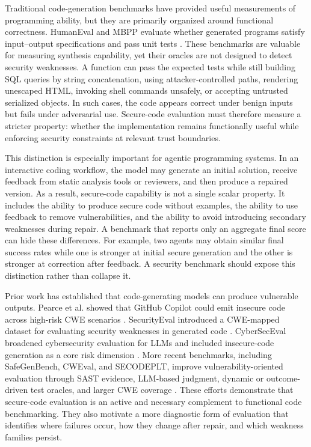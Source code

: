 \documentclass[11pt]{article}
\begin{document}
Traditional code-generation benchmarks have provided useful measurements of programming ability, but they are primarily organized around functional correctness. HumanEval and MBPP evaluate whether generated programs satisfy input--output specifications and pass unit tests \cite{chen2021codex,austin2021programsynthesis}. These benchmarks are valuable for measuring synthesis capability, yet their oracles are not designed to detect security weaknesses. A function can pass the expected tests while still building SQL queries by string concatenation, using attacker-controlled paths, rendering unescaped HTML, invoking shell commands unsafely, or accepting untrusted serialized objects. In such cases, the code appears correct under benign inputs but fails under adversarial use. Secure-code evaluation must therefore measure a stricter property: whether the implementation remains functionally useful while enforcing security constraints at relevant trust boundaries.

This distinction is especially important for agentic programming systems. In an interactive coding workflow, the model may generate an initial solution, receive feedback from static analysis tools or reviewers, and then produce a repaired version. As a result, secure-code capability is not a single scalar property. It includes the ability to produce secure code without examples, the ability to use feedback to remove vulnerabilities, and the ability to avoid introducing secondary weaknesses during repair. A benchmark that reports only an aggregate final score can hide these differences. For example, two agents may obtain similar final success rates while one is stronger at initial secure generation and the other is stronger at correction after feedback. A security benchmark should expose this distinction rather than collapse it.

Prior work has established that code-generating models can produce vulnerable outputs. Pearce et al. showed that GitHub Copilot could emit insecure code across high-risk CWE scenarios \cite{pearce2022asleep}. SecurityEval introduced a CWE-mapped dataset for evaluating security weaknesses in generated code \cite{siddiq2022securityeval}. CyberSecEval broadened cybersecurity evaluation for LLMs and included insecure-code generation as a core risk dimension \cite{bhatt2023cyberseceval}. More recent benchmarks, including SafeGenBench, CWEval, and SECODEPLT, improve vulnerability-oriented evaluation through SAST evidence, LLM-based judgment, dynamic or outcome-driven test oracles, and larger CWE coverage \cite{li2025safegenbench,peng2025cweval,nie2025secodeplt}. These efforts demonstrate that secure-code evaluation is an active and necessary complement to functional code benchmarking. They also motivate a more diagnostic form of evaluation that identifies where failures occur, how they change after repair, and which weakness families persist.
\end{document}
